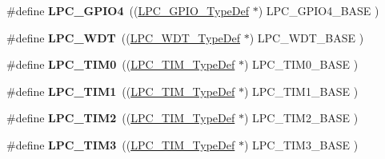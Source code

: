 \begin{DoxyCompactItemize}
\item 
\hypertarget{group___l_p_c17xx___system_ga652a560a972d4edec8a67cd85ad4bd60}{\#define {\bfseries \-L\-P\-C\-\_\-\-G\-P\-I\-O4}~((\hyperlink{struct_l_p_c___g_p_i_o___type_def}{\-L\-P\-C\-\_\-\-G\-P\-I\-O\-\_\-\-Type\-Def}      $\ast$) \-L\-P\-C\-\_\-\-G\-P\-I\-O4\-\_\-\-B\-A\-S\-E    )}\label{group___l_p_c17xx___system_ga652a560a972d4edec8a67cd85ad4bd60}

\item 
\hypertarget{group___l_p_c17xx___system_ga7d68cf0829652bd8c1f837c697653c5f}{\#define {\bfseries \-L\-P\-C\-\_\-\-W\-D\-T}~((\hyperlink{struct_l_p_c___w_d_t___type_def}{\-L\-P\-C\-\_\-\-W\-D\-T\-\_\-\-Type\-Def}       $\ast$) \-L\-P\-C\-\_\-\-W\-D\-T\-\_\-\-B\-A\-S\-E      )}\label{group___l_p_c17xx___system_ga7d68cf0829652bd8c1f837c697653c5f}

\item 
\hypertarget{group___l_p_c17xx___system_ga6002a8a8684b782ae7345834f6dcbf36}{\#define {\bfseries \-L\-P\-C\-\_\-\-T\-I\-M0}~((\hyperlink{struct_l_p_c___t_i_m___type_def}{\-L\-P\-C\-\_\-\-T\-I\-M\-\_\-\-Type\-Def}       $\ast$) \-L\-P\-C\-\_\-\-T\-I\-M0\-\_\-\-B\-A\-S\-E     )}\label{group___l_p_c17xx___system_ga6002a8a8684b782ae7345834f6dcbf36}

\item 
\hypertarget{group___l_p_c17xx___system_ga01fc9c608a87fe135cbe8799a3908119}{\#define {\bfseries \-L\-P\-C\-\_\-\-T\-I\-M1}~((\hyperlink{struct_l_p_c___t_i_m___type_def}{\-L\-P\-C\-\_\-\-T\-I\-M\-\_\-\-Type\-Def}       $\ast$) \-L\-P\-C\-\_\-\-T\-I\-M1\-\_\-\-B\-A\-S\-E     )}\label{group___l_p_c17xx___system_ga01fc9c608a87fe135cbe8799a3908119}

\item 
\hypertarget{group___l_p_c17xx___system_ga459250a0031a3c6c45d033faf8a7a39a}{\#define {\bfseries \-L\-P\-C\-\_\-\-T\-I\-M2}~((\hyperlink{struct_l_p_c___t_i_m___type_def}{\-L\-P\-C\-\_\-\-T\-I\-M\-\_\-\-Type\-Def}       $\ast$) \-L\-P\-C\-\_\-\-T\-I\-M2\-\_\-\-B\-A\-S\-E     )}\label{group___l_p_c17xx___system_ga459250a0031a3c6c45d033faf8a7a39a}

\item 
\hypertarget{group___l_p_c17xx___system_ga12f449e7f05cf8ab3f066cf490335a87}{\#define {\bfseries \-L\-P\-C\-\_\-\-T\-I\-M3}~((\hyperlink{struct_l_p_c___t_i_m___type_def}{\-L\-P\-C\-\_\-\-T\-I\-M\-\_\-\-Type\-Def}       $\ast$) \-L\-P\-C\-\_\-\-T\-I\-M3\-\_\-\-B\-A\-S\-E     )}\label{group___l_p_c17xx___system_ga12f449e7f05cf8ab3f066cf490335a87}


\end{DoxyCompactItemize}
